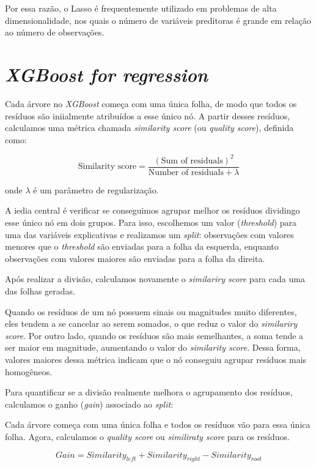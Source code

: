 \documentclass{article}
\begin{document}
Por essa razão, o Lasso é frequentemente utilizado em problemas de alta 
dimensionalidade, nos quais o número de variáveis preditoras é grande em 
relação ao número de observações.

\section{\textit{XGBoost for regression}}

Cada árvore no \textit{XGBoost} começa com uma única folha, de modo que 
todos os resíduos são iniialmente atribuídos a esse único nó. A partir 
desses resíduos, calculamos uma métrica chamada 
\textit{similarity score}  (ou \textit{quality score}), definida como:

\begin{equation}
    \text{Similarity score} =
    \frac{(\text{Sum of residuals})^2}{\text{Number of residuals} + \lambda}
\end{equation}

onde $\lambda$ é um parâmetro de regularização.

A iedia central é verificar se conseguimos agrupar melhor os resíduos 
dividingo esse único nó em dois grupos. Para isso, escolhemos um valor 
(\textit{threshold}) para uma das variáveis explicativas e realizamos 
um \textit{split}: observações com valores menores que o \textit{threshold}
são enviadas para a folha da esquerda, enquanto observações com valores maiores
são enviadas para a folha da direita.

Após realizar a divisão, calculamos novamente o \textit{similariry score} 
para cada uma das folhas geradas.

Quando os resíduos de um nó possuem sinais ou magnitudes muito diferentes,
eles tendem a se cancelar ao serem somados, o que reduz o valor do 
\textit{similariry score}. Por outro lado, quando os resíduos são mais 
semelhantes, a soma tende a ser maior em magnitude, aumentando o valor 
do \textit{similarity score}. Dessa forma, valores maiores dessa métrica 
indicam que o nó conseguiu agrupar resíduos mais homogêneos.

Para quantificar se a divisão realmente melhora o agrupamento dos
resíduos, calculamos o ganho (\textit{gain}) associado ao \textit{split}:

Cada árvore começa com uma única folha e todos os resíduos
vão para essa única folha. Agora, calculamos o \textit{quality score}
ou \textit{similiraty score} para os resíduos. 

\begin{equation}
    Gain =
    Similarity_{left} +
    Similarity_{right} -
    Similarity_{root}
\end{equation}
\end{document}
